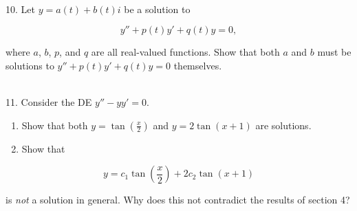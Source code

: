 \documentclass{article}
\begin{document}
~\\

10. Let $y = a(t) + b(t)i$ be a solution to

$$
	y'' + p(t)y' + q(t)y = 0,
$$

where $a$, $b$, $p$, and $q$ are all real-valued functions. Show that both $a$ and $b$ must be solutions to $y'' + p(t)y' + q(t)y = 0$ themselves.

~\\

11. Consider the DE $\displaystyle y'' - yy' = 0.$

\begin{enumerate}

	\item Show that both $\displaystyle y = \tan\left(\frac{x}{2}\right)$ and $\displaystyle y = 2\tan\left(x + 1\right)$ are solutions.

	\item Show that

\end{enumerate}

$$
	y = c_1\tan\left(\frac{x}{2}\right) + 2c_2\tan\left(x + 1\right)
$$

is \textit{not} a solution in general. Why does this not contradict the results of section 4?
\end{document}
